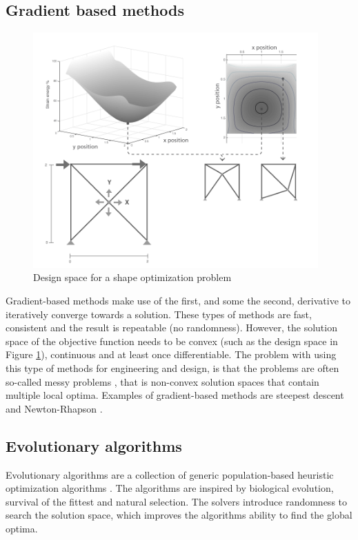 \subsection{Gradient based methods}
\begin{figure}
  \includegraphics[width=310pt]{graphics/designspace.png}
  \caption{Design space for a shape optimization problem}
  \label{fig:designspace}
\end{figure}

Gradient-based methods make use of the first, and some the second, derivative to iteratively converge towards a solution. These types of methods are fast, consistent and the result is repeatable (no randomness). However, the solution space of the objective function needs to be convex (such as the design space in Figure \ref{fig:designspace}), continuous and at least once differentiable. The problem with using this type of methods for engineering and design, is that the problems are often so-called messy problems \cite{schlaich2006challenges}, that is non-convex solution spaces that contain multiple local optima. Examples of gradient-based methods are steepest descent and Newton-Rhapson \cite{christensen2008introduction}. 

\subsection{Evolutionary algorithms}
Evolutionary algorithms are a collection of generic population-based heuristic optimization algorithms \cite{Bangert2012}. The algorithms are inspired by biological evolution, survival of the fittest and natural selection. The solvers introduce randomness to search the solution space, which improves the algorithms ability to find the global optima.

